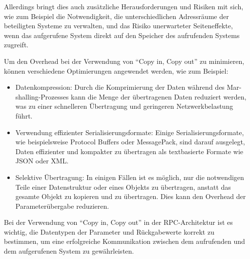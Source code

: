 Allerdings bringt dies auch zusätzliche Herausforderungen und Risiken mit sich, wie zum Beispiel die Notwendigkeit, die unterschiedlichen Adressräume der beteiligten Systeme zu verwalten, und das Risiko unerwarteter Seiteneffekte, wenn das aufgerufene System direkt auf den Speicher des aufrufenden Systems zugreift.

Um den Overhead bei der Verwendung von \enquote{Copy in, Copy out} zu minimieren, können verschiedene Optimierungen angewendet werden, wie zum Beispiel:

\begin{itemize} 
\item Datenkompression: Durch die Komprimierung der Daten während des Mar-shalling-Prozesses kann die Menge der übertragenen Daten reduziert werden, was zu einer schnelleren Übertragung und geringeren Netzwerkbelastung führt.
\item Verwendung effizienter Serialisierungsformate: Einige Serialisierungsformate, wie beispielsweise Protocol Buffers oder MessagePack, sind darauf ausgelegt, Daten effizienter und kompakter zu übertragen als textbasierte Formate wie JSON oder XML.
\item Selektive Übertragung: In einigen Fällen ist es möglich, nur die notwendigen Teile einer Datenstruktur oder eines Objekts zu übertragen, anstatt das gesamte Objekt zu kopieren und zu übertragen. Dies kann den Overhead der Parameterübergabe reduzieren.
\end{itemize} 

Bei der Verwendung von \enquote{Copy in, Copy out} in der RPC-Architektur ist es wichtig, die Datentypen der Parameter und Rückgabewerte korrekt zu bestimmen, um eine erfolgreiche Kommunikation zwischen dem aufrufenden und dem aufgerufenen System zu gewährleisten. 


